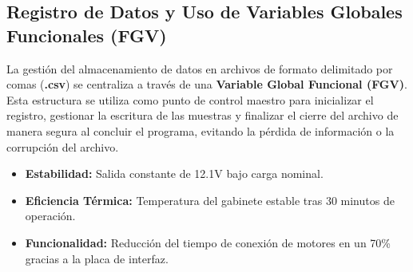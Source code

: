 \subsection{Registro de Datos y Uso de Variables Globales Funcionales (FGV)}
La gestión del almacenamiento de datos en archivos de formato delimitado por comas (\textbf{.csv}) se centraliza a través de una \textbf{Variable Global Funcional (FGV)}. Esta estructura se utiliza como punto de control maestro para inicializar el registro, gestionar la escritura de las muestras y finalizar el cierre del archivo de manera segura al concluir el programa, evitando la pérdida de información o la corrupción del archivo.





\begin{resultadosFase}
	\begin{itemize}
		\item \textbf{Estabilidad:} Salida constante de 12.1V bajo carga nominal.
		\item \textbf{Eficiencia Térmica:} Temperatura del gabinete estable tras 30 minutos de operación.
		\item \textbf{Funcionalidad:} Reducción del tiempo de conexión de motores en un 70\% gracias a la placa de interfaz.
	\end{itemize}
\end{resultadosFase}